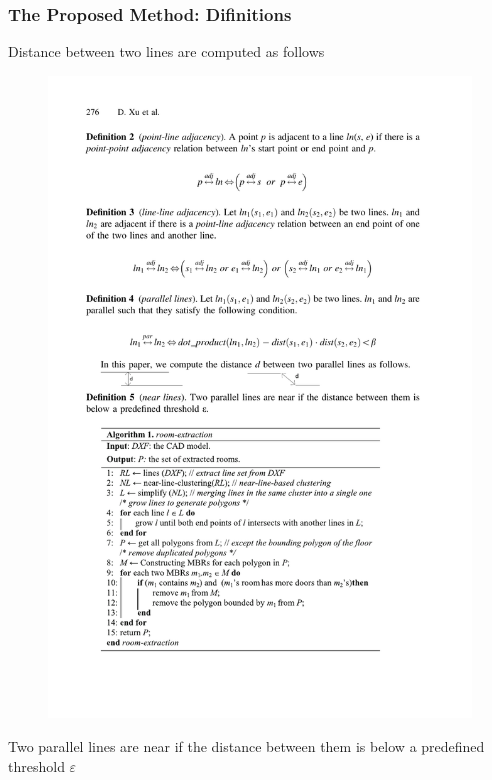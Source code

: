 
\begin{frame}
\frametitle{The Proposed Method: Difinitions}

Distance between two lines are computed as follows
\begin{figure}[tb]
  \includegraphics[width=\columnwidth]{figures/2-8/2-8-2.pdf}
\end{figure}

\begin{definition}
  Two parallel lines are near if the distance between them is below a predefined threshold $\varepsilon$
\end{definition}

\end{frame}

